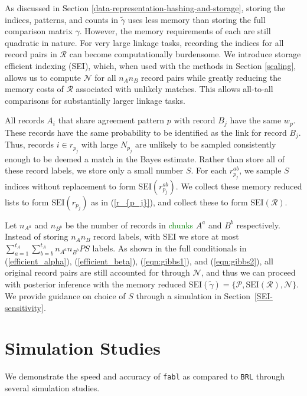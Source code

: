 \documentclass[ba]{imsart}
\begin{document}
As discussed in Section \ref{data-representation-hashing-and-storage}, storing the indices, patterns, and counts in $\tilde{\gamma}$ uses less memory than storing the full comparison matrix $\gamma$. However, the memory requirements of each are still quadratic in nature. For very large linkage tasks, recording the indices for all record pairs in $\mathcal{R}$ can become computationally burdensome. We introduce storage efficient indexing (SEI), which, when used with the methods in Section \ref{scaling}, allows us to compute $\mathcal{N}$ for all $n_A n_B$ record pairs while greatly reducing the memory costs of $\mathcal{R}$ associated with unlikely matches. This allows all-to-all comparisons for substantially larger linkage tasks.

All records $A_i$ that share agreement pattern $p$ with record $B_j$ have the same $w_{p}$. These records have the same probability to be identified as the link for record $B_j$. Thus, records $i \in r_{p_j}$ with large $N_{p_j}$ are unlikely to be sampled consistently enough to be deemed a match in the Bayes estimate. Rather than store all of these record labels, we store only a small number $S$. For each $r_{p_j}^{ab}$, we sample $S$ indices without replacement to form $\text{SEI}(r_{p_j}^{ab})$. We collect these memory reduced lists to form $\text{SEI}(r_{p_j})$ as in (\ref{r_{p_j}}), and collect these to form $\text{SEI}(\mathcal{R})$.

Let $n_{A^a}$ and $n_{B^b}$ be the number of records in \textcolor{green}{chunks} $A^a$ and $B^b$ respectively. Instead of storing $n_A n_B$ record labels, with SEI we store at most $\sum_{a = 1}^{t_A}\sum_{b = b}^{t_A} n_{A^a}  n_{B^b}  P  S$ labels. As shown in the full conditionals in (\ref{efficient_alpha}),  (\ref{efficient_beta}), (\ref{eqn:gibbs1}), and (\ref{eqn:gibbs2}), all original record pairs are still accounted for through $\mathcal{N}$, and thus we can proceed with posterior inference with the memory reduced $\text{SEI}(\tilde{\gamma}) = \{\mathcal{P}, \text{SEI}(\mathcal{R}), \mathcal{N}\}$. We provide guidance on choice of $S$ through a simulation in Section~\ref{SEI-sensitivity}.

	\section{Simulation Studies}
	\label{sec:simulations}
	
	We demonstrate the speed and accuracy of \texttt{fabl} as compared to \texttt{BRL} through several simulation studies. 
	
\end{document}

